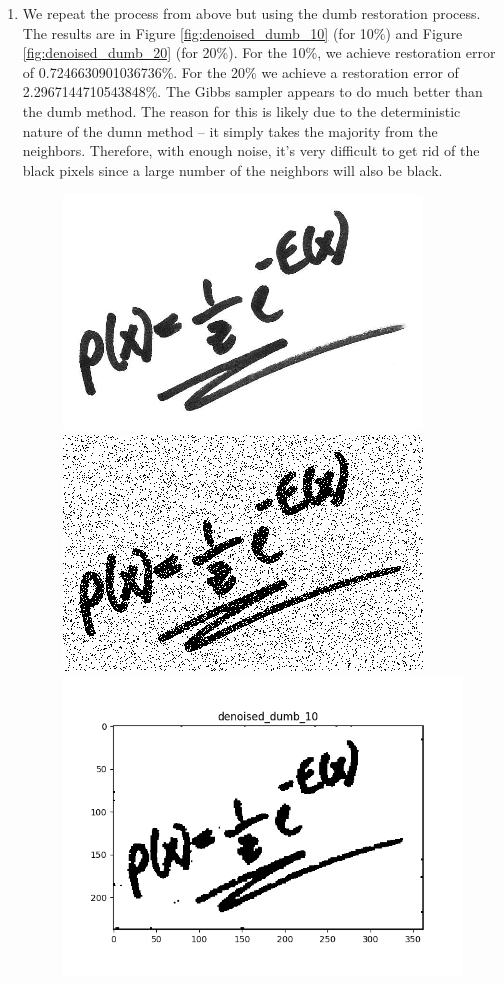\documentclass[12pt]{article}
\begin{document}
\begin{enumerate}[label=(\alph*)]
\item We repeat the process from above but using the dumb restoration process. The results are in Figure \ref{fig:denoised_dumb_10} (for 10\%) and Figure \ref{fig:denoised_dumb_20} (for 20\%). For the 10\%, we achieve restoration error of 0.7246630901036736\%. For the 20\% we achieve a restoration error of 2.2967144710543848\%. The Gibbs sampler appears to do much better than the dumb method. The reason for this is likely due to the deterministic nature of the dumn method -- it simply takes the majority from the neighbors. Therefore, with enough noise, it's very difficult to get rid of the black pixels since a large number of the neighbors will also be black.

\begin{figure}[!ht]
\centering
\includegraphics[scale=0.33]{programming/orig.png}
\includegraphics[scale=0.33]{programming/noisy_10.png}
\includegraphics[scale=0.33]{programming/denoised_dumb_10.png}

\end{figure}
\end{enumerate}
\end{document}
